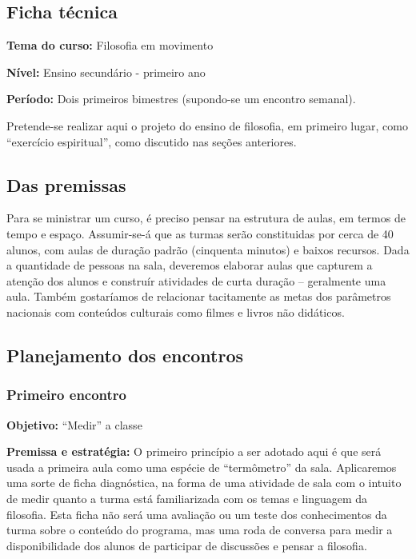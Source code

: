 \documentclass[12pt,a4paper]{article}
\begin{document}
	\subsection{Ficha técnica}

	\textbf{Tema do curso:} Filosofia em movimento

	\textbf{Nível:} Ensino secundário - primeiro ano

	\textbf{Período:} Dois primeiros bimestres (supondo-se um encontro
	semanal). 

	Pretende-se realizar aqui o projeto do ensino de filosofia, em 
	primeiro lugar, como “exercício espiritual”, como discutido nas 
	seções anteriores. 

	\subsection{Das premissas}

	Para se ministrar um curso, é preciso pensar na 
	estrutura de aulas, em termos de tempo e espaço. Assumir-se-á que 
	as turmas serão constituidas por cerca de 40 alunos, com aulas de 
	duração padrão (cinquenta minutos) e baixos recursos. 
	Dada a quantidade de 
	pessoas na sala, deveremos elaborar aulas que capturem a atenção dos 
	alunos e construír atividades de curta duração -- geralmente uma aula.
	Também gostaríamos de relacionar tacitamente as metas dos parâmetros 
	nacionais com 	conteúdos culturais como filmes 
	e livros não didáticos. 

	\subsection{Planejamento dos encontros}

	\subsubsection{Primeiro encontro}

	\textbf{Objetivo:} “Medir” a classe

	\textbf{Premissa e estratégia:}
	O primeiro princípio a ser adotado aqui é que será usada a primeira aula 
	como uma espécie de ``termômetro'' da sala. Aplicaremos uma sorte de 
	ficha diagnóstica, na forma de uma atividade de sala com o intuito 
	de medir quanto a turma está familiarizada com os temas e linguagem 
	da filosofia. Esta ficha não será uma avaliação ou um teste dos 
	conhecimentos da turma sobre o conteúdo do programa, mas uma roda de 
	conversa para medir a disponibilidade dos alunos de participar de 
	discussões e pensar a filosofia. 
	
\end{document}
